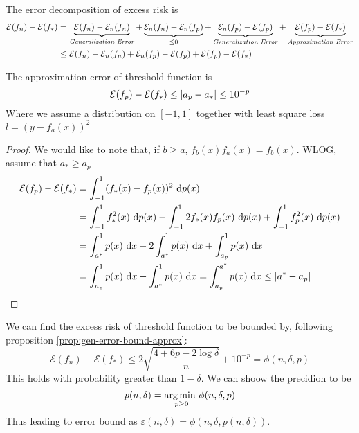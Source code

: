 \begin{proposition}
    The error decomposition of excess risk is 
    \label{prop:gen-error-bound-approx}
    \begin{equation*}
    \begin{aligned}
        \mathcal{E}(f_n) - \mathcal{E}(f_*) &= \underbrace{\mathcal{E}(f_n) - \mathcal{E}_n(f_n)}_{\text{\emph{Generalization Error}}} + \underbrace{\mathcal{E}_n(f_n) - \mathcal{E}_n(f_p)}_{\le0} + \underbrace{\mathcal{E}_n(f_p) - \mathcal{E}(f_p)}_{\text{\emph{Generalization Error}}} + \underbrace{\mathcal{E}(f_p) - \mathcal{E}(f_*)}_{\text{\emph{Approximation Error}}} \\
        &\le \mathcal{E}(f_n) - \mathcal{E}_n(f_n) + \mathcal{E}_n(f_p) - \mathcal{E}(f_p) + \mathcal{E}(f_p) - \mathcal{E}(f_*) \\
    \end{aligned}
    \end{equation*}
\end{proposition}

\begin{lemma}
    The approximation error of threshold function is 
    \begin{equation*}
        \mathcal{E}(f_p) - \mathcal{E}(f_*)  \le\left| a_p-a_* \right|\le10^{-p}
    \end{equation*}
    Where we assume a distribution on $[-1, 1]$ together with least square loss $l=(y-f_a(x))^2$
\end{lemma}
\begin{proof}
    We would like to note that, if $b \ge a$, $f_b(x)f_a(x) = f_b(x)$. WLOG, assume that $a_* \ge a_p$
    \begin{equation*}
    \begin{aligned}
        \mathcal{E}(f_p) - \mathcal{E}(f_*) &= \int^1_{-1} (f_*(x) - f_p(x))^2\ \mathrm{d} p(x) \\
        &= \int^1_{-1}f_*^2(x)\ \mathrm{d} p(x) - \int^1_{-1}2f_*(x)f_p(x)\ \mathrm{d} p(x) + \int^1_{-1}f^2_p(x)\ \mathrm{d} p(x) \\
        &= \int^1_{a^*}p(x)\ \mathrm{d} x - 2\int^1_{a^*}p(x)\ \mathrm{d} x + \int^1_{a_p}p(x)\ \mathrm{d} x \\
        &= \int^1_{a_p}p(x)\ \mathrm{d} x - \int^1_{a^*}p(x)\ \mathrm{d} x = \int^{a^*}_{a_p}p(x)\ \mathrm{d} x \le |a^*-a_p|
    \end{aligned}
    \end{equation*}
\end{proof}

\begin{remark}
    We can find the excess risk of threshold function to be bounded by, following proposition \ref{prop:gen-error-bound-approx}:
    \begin{equation*}
        \mathcal{E}(f_n) - \mathcal{E}(f_*) \le 2\sqrt{\frac{4 + 6p-2\log\delta}{n}} + 10^{-p} =\phi(n,\delta,p)
    \end{equation*}
    This holds with probability greater than $1-\delta$. We can shoow the precidion to be 
    \begin{equation*}
        p(n,\delta) = \underset{p\ge0}{\arg\min \ }\phi(n,\delta,p)
    \end{equation*}
    Thus leading to error bound as $\varepsilon(n,\delta)=\phi(n,\delta,p(n,\delta))$. 
\end{remark}

